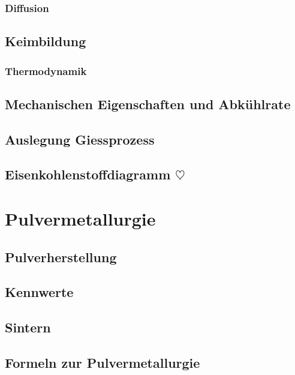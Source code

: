 \documentclass[12pt]{cheatsheet}
\begin{document}
    \subsubsection*{Diffusion}
    
    \subsection*{Keimbildung}
    
    \subsubsection*{Thermodynamik}
    
    \subsection*{Mechanischen Eigenschaften und Abkühlrate}
    
    \subsection*{Auslegung Giessprozess}
    
    \subsection*{Eisenkohlenstoffdiagramm $\heartsuit$}
    

\section*{Pulvermetallurgie}
    
    \subsection*{Pulverherstellung}
    
    \subsection*{Kennwerte}
    
    \vfill \null \columnbreak
    \subsection*{Sintern}
    
    \subsection*{Formeln zur Pulvermetallurgie}
    
\end{document}
